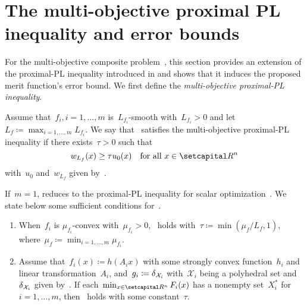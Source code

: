 \documentclass[../main]{subfiles}
\begin{document}
\section{The multi-objective proximal PL inequality and error bounds} 
For the multi-objective composite problem~, this section provides an extension of the proximal-PL inequality introduced in  and shows that it induces the proposed merit function's error bound.
We first define the \emph{multi-objective proximal-PL inequality}.
\begin{definition} 
    Assume that~$f_i, i = 1, \dots, m$ is~$L_{f_i}$-smooth with~$L_{f_i} > 0$ and let~$L_f \coloneqq \max_{i = 1, \dots, m} L_{f_i}$.
    We say that~ satisfies the multi-objective proximal-PL inequality if there exists~$\tau > 0$ such that
    \begin{equation} \label{eq:proximal_PL_MO}
        w_{L_f}(x) \ge \tau u_0(x) \forallcondition{x \in \setR^n}
    \end{equation}
    with~$u_0$ and~$w_{L_f}$ given by~.
\end{definition}
If~$m = 1$,  reduces to the proximal-PL inequality for scalar optimization~.
We state below some sufficient conditions for~.
\begin{proposition} 
    \begin{enumerate}
        \item When~$f_i$ is $\mu_{f_i}$-convex with~$\mu_{f_i} > 0$,~ holds with~$\tau \coloneqq \min (\mu_f / L_f, 1)$, where~$\mu_f \coloneqq \min_{i = 1, \dots, m} \mu_{f_i}$. 
        \item Assume that~$f_i(x) \coloneqq h(A_i x)$ with some strongly convex function~$h_i$ and linear transformation~$A_i$, and~$g_i \coloneqq \operatorname{\delta}_{\mathcal{X}_i}$ with~$\mathcal{X}_i$ being a polyhedral set and~$\operatorname{\delta}_{\mathcal{X}_i}$ given by~.
            If each~$\min_{x \in \setR^n} F_i(x)$ has a nonempty set~$X_i^*$ for~$i = 1, \dots, m$, then~ holds with some constant~$\tau$. 
    \end{enumerate}
\end{proposition}
\end{document}
